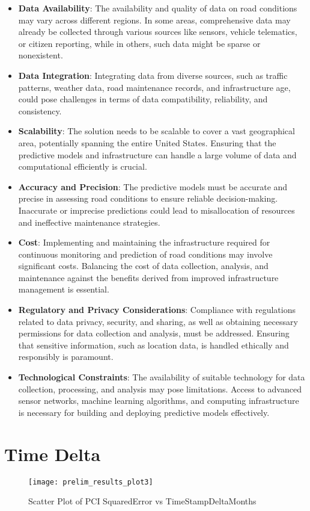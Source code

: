 \documentclass{article}
\begin{document}
\begin{appendices}
\begin{itemize}[leftmargin=*]
\item \textbf{Data Availability}: The availability and quality of data on road conditions may vary across different regions. In some areas, comprehensive data may already be collected through various sources like sensors, vehicle telematics, or citizen reporting, while in others, such data might be sparse or nonexistent.
\item \textbf{Data Integration}: Integrating data from diverse sources, such as traffic patterns, weather data, road maintenance records, and infrastructure age, could pose challenges in terms of data compatibility, reliability, and consistency.
\item \textbf{Scalability}: The solution needs to be scalable to cover a vast geographical area, potentially spanning the entire United States. Ensuring that the predictive models and infrastructure can handle a large volume of data and computational efficiently is crucial.
\item \textbf{Accuracy and Precision}: The predictive models must be accurate and precise in assessing road conditions to ensure reliable decision-making. Inaccurate or imprecise predictions could lead to misallocation of resources and ineffective maintenance strategies.
\item \textbf{Cost}: Implementing and maintaining the infrastructure required for continuous monitoring and prediction of road conditions may involve significant costs. Balancing the cost of data collection, analysis, and maintenance against the benefits derived from improved infrastructure management is essential.
\item \textbf{Regulatory and Privacy Considerations}: Compliance with regulations related to data privacy, security, and sharing, as well as obtaining necessary permissions for data collection and analysis, must be addressed. Ensuring that sensitive information, such as location data, is handled ethically and responsibly is paramount.
\item \textbf{Technological Constraints}: The availability of suitable technology for data collection, processing, and analysis may pose limitations. Access to advanced sensor networks, machine learning algorithms, and computing infrastructure is necessary for building and deploying predictive models effectively.

\end{itemize}

\section{ Time Delta }

\begin{figure}[ht]
\centering
    \texttt{[image: prelim\_results\_plot3]}
    \caption{Scatter Plot of PCI SquaredError vs TimeStampDeltaMonths}
    \label{fig:verticalcell}
\end{figure}

\end{appendices}
\end{document}
